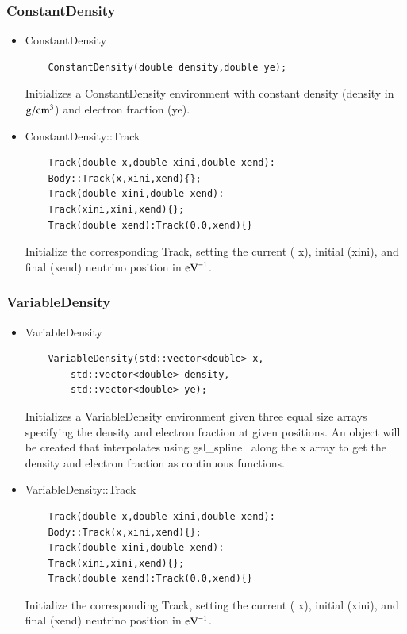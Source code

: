 \documentclass[3p,12pt]{elsarticle}
\newcommand{\ttf}{\ttfamily}
\begin{document}
\subsubsection{ConstantDensity \label{sec:constant_density}}

\begin{itemize}
\item {\ttf ConstantDensity}
  \begin{lstlisting}
    ConstantDensity(double density,double ye);
  \end{lstlisting}
  Initializes a {\ttf ConstantDensity} environment with constant
  density ({\ttf density} in ${\rm g}/{\rm cm}^3$) and electron
  fraction ({\ttf ye}).
\item {\ttf ConstantDensity::Track}
  \begin{lstlisting}
    Track(double x,double xini,double xend):
    Body::Track(x,xini,xend){};
    Track(double xini,double xend):
    Track(xini,xini,xend){};
    Track(double xend):Track(0.0,xend){}
  \end{lstlisting}
  Initialize the corresponding {\ttf Track}, setting the current ({\ttf
  x}), initial ({\ttf xini}), and final ({\ttf xend}) neutrino position in ${\rm eV}^{-1}$.
\end{itemize}

\subsubsection{VariableDensity \label{sec:variable_density}}

\begin{itemize}
\item {\ttf VariableDensity}
  \begin{lstlisting}
    VariableDensity(std::vector<double> x,
        std::vector<double> density,
        std::vector<double> ye);
  \end{lstlisting}
  Initializes a {\ttf VariableDensity} environment given three equal size arrays specifying the density and electron fraction at given positions. An object will be created that interpolates using {\ttfamily gsl\_spline}~\citep{gough2009gnu} along the {\ttf x} array to get the density and electron fraction as continuous functions.
  \item {\ttf VariableDensity::Track}
  \begin{lstlisting}
    Track(double x,double xini,double xend):
    Body::Track(x,xini,xend){};
    Track(double xini,double xend):
    Track(xini,xini,xend){};
    Track(double xend):Track(0.0,xend){}
  \end{lstlisting}
  Initialize the corresponding {\ttf Track}, setting the current ({\ttf
  x}), initial ({\ttf xini}), and final ({\ttf xend}) neutrino position in ${\rm eV}^{-1}$.
\end{itemize}
\end{document}
